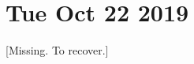 \documentclass[main.tex]{subfiles}
\begin{document}
\section*{Tue Oct 22 2019}
[Missing. To recover.]
\end{document}
